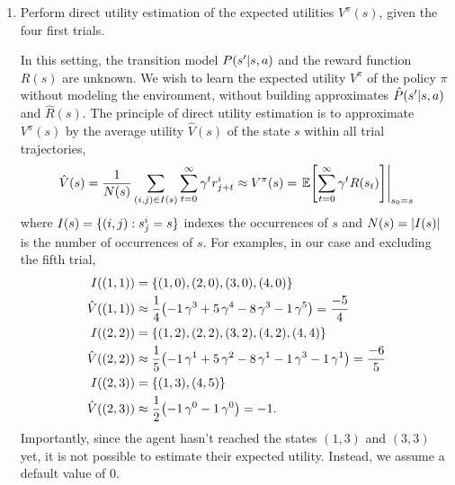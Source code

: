 \documentclass[11pt, a4paper]{article}
\begin{document}
\begin{enumerate}
    \item Perform direct utility estimation of the expected utilities $V^\pi(s)$, given the four first trials.

    \begin{solution}
        In this setting, the transition model $P(s' \vert s, a)$ and the reward function $R(s)$ are unknown. We wish to learn the expected utility $V^\pi$ of the policy $\pi$ without modeling the environment, \ie{} without building approximates $\hat{P}(s' \vert s, a)$ and $\hat{R}(s)$. The principle of direct utility estimation is to approximate $V^\pi(s)$ by the average utility $\hat{V}(s)$ of the state $s$ within all trial trajectories, \ie{}
        \begin{equation*}
            \hat{V}(s) = \frac{1}{N(s)} \sum_{(i, j) \in I(s)} \sum_{t = 0}^{\infty} \gamma^t r^i_{j + t} \approx V^\pi(s) = \left. \E \sbk*{\sum_{t = 0}^{\infty} \gamma^t R(s_t)} \right|_{s_0 = s}
        \end{equation*}
        where $I(s) = \{(i, j): s^i_j = s\}$ indexes the occurrences of $s$ and $N(s) = \lvert I(s)\rvert$ is the number of occurrences of $s$. For examples, in our case and excluding the fifth trial,
        \begin{align*}
            I((1, 1)) & = \cbk{(1, 0), (2, 0), (3, 0), (4, 0)} \\
            \hat{V}((1, 1)) & \approx \frac{1}{4} \rbk*{- 1 \, \gamma^3 + 5 \, \gamma^4 - 8 \, \gamma^3 - 1 \, \gamma^5} = \frac{-5}{4} \\
            I((2, 2)) & = \cbk{(1, 2), (2, 2), (3, 2), (4, 2), (4, 4)} \\
            \hat{V}((2, 2)) & \approx \frac{1}{5} \rbk*{- 1 \, \gamma^1 + 5 \, \gamma^2 - 8 \, \gamma^1 - 1 \, \gamma^3 - 1 \, \gamma^1} = \frac{-6}{5} \\
            I((2, 3)) & = \cbk{(1, 3), (4, 5)} \\
            \hat{V}((2, 3)) & \approx \frac{1}{2} \rbk*{- 1 \, \gamma^0 - 1 \, \gamma^0} = -1 .
        \end{align*}
        Importantly, since the agent hasn't reached the states $(1, 3)$ and $(3, 3)$ yet, it is not possible to estimate their expected utility. Instead, we assume a default value of $0$.

        \begin{figure}[h]
            \centering
\end{figure}
\end{solution}
\end{enumerate}
\end{document}
